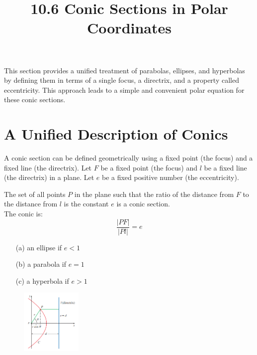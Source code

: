 \documentclass{article}
\title{10.6 Conic Sections in Polar Coordinates}
\date{}
\author{}
\begin{document}
\maketitle

This section provides a unified treatment of parabolas, ellipses, and hyperbolas by defining them in terms of a single focus, a directrix, and a property called eccentricity. This approach leads to a simple and convenient polar equation for these conic sections.

\section*{A Unified Description of Conics}

A conic section can be defined geometrically using a fixed point (the focus) and a fixed line (the directrix).
Let $F$ be a fixed point (the focus) and $l$ be a fixed line (the directrix) in a plane. 
Let $e$ be a fixed positive number (the eccentricity). \\

\begin{tcolorbox}[
    colback=white!,   %
    colframe=orange!80!white, %
    title=Conics Defined by a Focus and a Directrix,   %
    boxrule=0.5mm,          %
    arc=3mm               %
    ]
    The set of all points $P$ in the plane such that the ratio of the distance from $F$ to the distance from $l$ is the constant $e$ is a conic section.\\
    The conic is:
    \[
    \dfrac{|PF|}{|Pl|} = e
    \]
\begin{itemize}
    \item[(a)] an ellipse if $e < 1$
    \item[(b)] a parabola if $e = 1$
    \item[(c)] a hyperbola if $e > 1$
\end{itemize}
\end{tcolorbox}

\begin{figure} %
    \includegraphics[width=0.26\textwidth]{graph60.png}
\end{figure}
\end{document}
